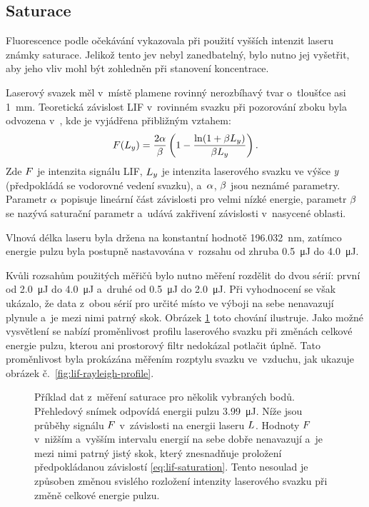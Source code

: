 \subsection{Saturace}
\label{sec:lif-saturation}
Fluorescence podle očekávání vykazovala při použití vyšších intenzit laseru
znám\-ky saturace.
Jelikož tento jev nebyl zanedbatelný, bylo nutno jej vyšetřit,
aby jeho vliv mohl být zohledněn při stanovení koncentrace.

Laserový svazek měl v~místě plamene rovinný nerozbíhavý tvar
o~tloušťce asi \SI{1}{\milli\metre}.
Teoretická závislost LIF v~rovinném svazku při pozorování zboku
byla odvozena v~\cite{lif-pb}, kde je vyjádřena přibližným vztahem:
\begin{equation}
	\label{eq:lif-saturation}
	F(L_y) = \frac{2\alpha}{\beta}
	\left( 1 - \frac{\ln(1 + \beta L_y)}{\beta L_y} \right).
\end{equation}
Zde $F$ je intenzita signálu LIF,
$L_y$ je intenzita laserového svazku ve výšce $y$
(předpokládá se vodorovné vedení svazku),
a~$\alpha$, $\beta$ jsou neznámé parametry.
Parametr $\alpha$ popisuje lineární část závislosti pro velmi nízké energie,
parametr $\beta$ se nazývá saturační parametr a~udává zakřivení
závislosti v~nasycené oblasti.

Vlnová délka laseru byla držena na konstantní
hodnotě \SI{196.032}{\nano\metre},
zatímco energie pulzu byla postupně nastavována v~rozsahu
od zhruba \SI{0.5}{\micro\joule} do \SI{4.0}{\micro\joule}.

Kvůli rozsahům použitých měřičů bylo nutno měření rozdělit do dvou sérií:
první od \SI{2.0}{\micro\joule} do \SI{4.0}{\micro\joule}
a~druhé od \SI{0.5}{\micro\joule} do \SI{2.0}{\micro\joule}.
Při vyhodnocení se však ukázalo, že data z~obou sérií pro určité místo
ve výboji na sebe nenavazují plynule a~je mezi nimi patrný skok.
Obrázek \ref{fig:lif-saturation-full-example} toto chování ilustruje.
Jako možné vysvětlení se nabízí proměnlivost profilu laserového svazku
při změnách celkové energie pulzu, kterou ani prostorový filtr
nedokázal potlačit úplně.
Tato proměnlivost byla prokázána měřením rozptylu svazku ve~vzduchu,
jak ukazuje obrázek č.~\ref{fig:lif-rayleigh-profile}.

\begin{figure}
	\centering
	
	
	
	\caption{Příklad dat z~měření saturace pro několik vybraných bodů.
		Přehledový snímek odpovídá energii pulzu \SI{3.99}{\micro\joule}.
		Níže jsou průběhy signálu $F$ v~závislosti na energii
		laseru $L$.
		Hodnoty $F$ v~nižším a~vyšším intervalu energií na sebe
		dobře nenavazují a~je mezi nimi patrný jistý skok,
		který znesnadňuje proložení předpokládanou
		závislostí \eqref{eq:lif-saturation}.
		Tento nesoulad je způsoben změnou svislého rozložení intenzity
		laserového svazku při změně celkové energie pulzu.}
	\label{fig:lif-saturation-full-example}
\end{figure}

